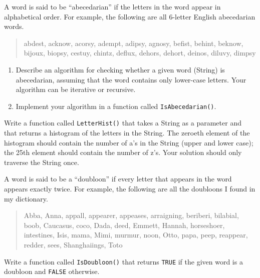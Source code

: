 
\begin{exercise}
A word is said to be ``abecedarian'' if the letters in the
word appear in alphabetical order.  For example, the following
are all 6-letter English abecedarian words.

\begin {quote}
abdest, acknow, acorsy, adempt, adipsy, agnosy, befist, behint,
beknow, bijoux, biopsy, cestuy, chintz, deflux, dehors, dehort,
deinos, diluvy, dimpsy
\end{quote}

\begin{enumerate}

\item Describe an algorithm for checking whether a given word (String)
is abecedarian, assuming that the word contains only lower-case
letters.  Your algorithm can be iterative or recursive.

\item Implement your algorithm in a function called {\tt IsAbecedarian()}.

\end{enumerate}
\end{exercise}



\begin{exercise}
Write a function called {\tt LetterHist()} that takes a String as a
parameter and that returns a histogram of the letters in the String.
The zeroeth element of the histogram should contain the number of a's
in the String (upper and lower case); the 25th element should contain
the number of z's.
Your solution should only traverse the String once.
\end{exercise}




\begin{exercise}
A word is said to be a ``doubloon'' if every letter that appears in the
word appears exactly twice.  For example, the following are all the
doubloons I found in my dictionary.

\begin {quote}
Abba, Anna, appall, appearer, appeases, arraigning, beriberi,
bilabial, boob, Caucasus, coco, Dada, deed, Emmett, Hannah,
horseshoer, intestines, Isis, mama, Mimi, murmur, noon, Otto, papa,
peep, reappear, redder, sees, Shanghaiings, Toto
\end{quote}

Write a function called {\tt IsDoubloon()} that returns {\tt TRUE}
if the given word is a doubloon and {\tt FALSE} otherwise.
\end{exercise}




